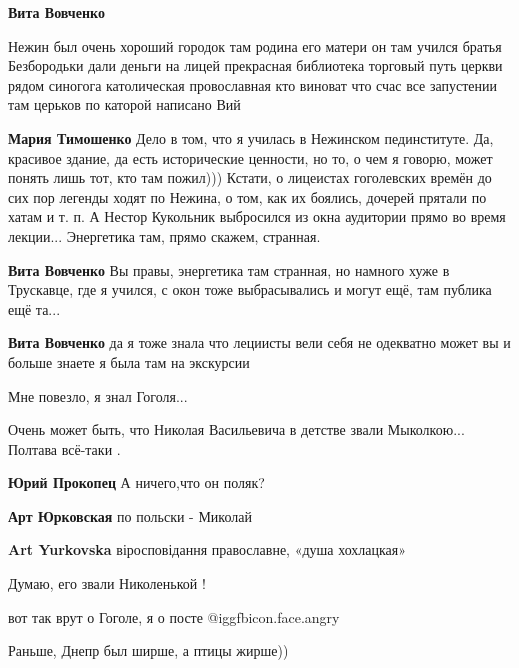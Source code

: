 \begin{itemize}
{\begin{itemize}
\begin{itemize}
\end{itemize} %

\textbf{Вита Вовченко} 

Нежин был очень хороший городок там родина его матери он там учился братья
Безбородьки дали деньги на лицей прекрасная библиотека торговый путь церкви
рядом синогога католическая провославная кто виноват что счас все запустении
там церьков по каторой написано Вий

\begin{itemize} %
\textbf{Мария Тимошенко} Дело в том, что я училась в Нежинском пединституте. Да, красивое здание, да есть исторические ценности, но то, о чем я говорю, может понять лишь тот, кто там пожил))) Кстати, о лицеистах гоголевских времён до сих пор легенды ходят по Нежина, о том, как их боялись, дочерей прятали по хатам и т. п. А Нестор Кукольник выбросился из окна аудитории прямо во время лекции... Энергетика там, прямо скажем, странная.

\textbf{Вита Вовченко} Вы правы, энергетика там странная, но намного хуже в Трускавце, где я учился, с окон тоже выбрасывались и могут ещё, там публика ещё та...

\textbf{Вита Вовченко} да я тоже знала что лециисты вели себя не одекватно может вы и больше знаете я была там на экскурсии
\end{itemize} %

\end{itemize} %

Мне повезло, я знал Гоголя...

Очень может быть, что Николая Васильевича в детстве звали Мыколкою... Полтава всё-таки .

\begin{itemize} %
\textbf{Юрий Прокопец} А ничего,что он поляк?

\textbf{Арт Юрковская} по польски - Миколай

\textbf{Art Yurkovska} віросповідання православне, «душа хохлацкая»

Думаю, его звали Николенькой !
\end{itemize} %

вот так врут о Гоголе, я о посте @igg{fbicon.face.angry} 

Раньше, Днепр был ширше, а птицы жирше))

}
\end{itemize}
